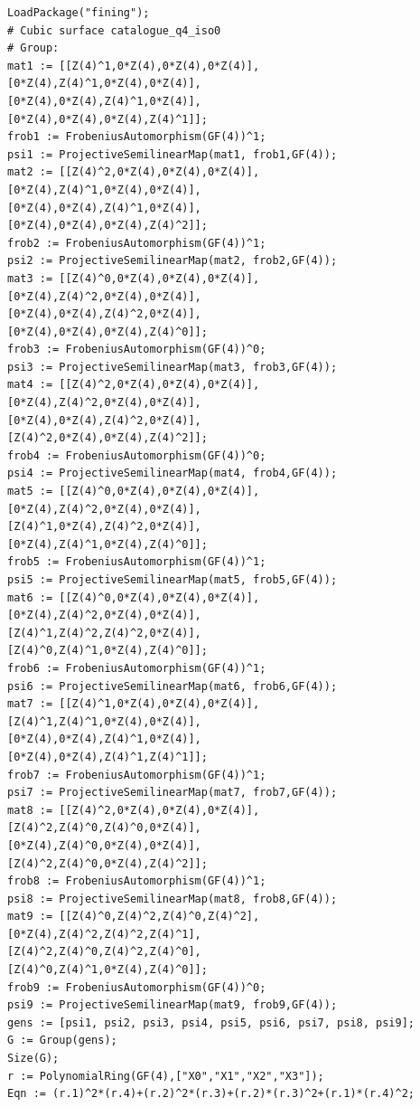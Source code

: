 \begin{verbatim}
LoadPackage("fining");
# Cubic surface catalogue_q4_iso0
# Group:
mat1 := [[Z(4)^1,0*Z(4),0*Z(4),0*Z(4)],
[0*Z(4),Z(4)^1,0*Z(4),0*Z(4)],
[0*Z(4),0*Z(4),Z(4)^1,0*Z(4)],
[0*Z(4),0*Z(4),0*Z(4),Z(4)^1]];
frob1 := FrobeniusAutomorphism(GF(4))^1;
psi1 := ProjectiveSemilinearMap(mat1, frob1,GF(4));
mat2 := [[Z(4)^2,0*Z(4),0*Z(4),0*Z(4)],
[0*Z(4),Z(4)^1,0*Z(4),0*Z(4)],
[0*Z(4),0*Z(4),Z(4)^1,0*Z(4)],
[0*Z(4),0*Z(4),0*Z(4),Z(4)^2]];
frob2 := FrobeniusAutomorphism(GF(4))^1;
psi2 := ProjectiveSemilinearMap(mat2, frob2,GF(4));
mat3 := [[Z(4)^0,0*Z(4),0*Z(4),0*Z(4)],
[0*Z(4),Z(4)^2,0*Z(4),0*Z(4)],
[0*Z(4),0*Z(4),Z(4)^2,0*Z(4)],
[0*Z(4),0*Z(4),0*Z(4),Z(4)^0]];
frob3 := FrobeniusAutomorphism(GF(4))^0;
psi3 := ProjectiveSemilinearMap(mat3, frob3,GF(4));
mat4 := [[Z(4)^2,0*Z(4),0*Z(4),0*Z(4)],
[0*Z(4),Z(4)^2,0*Z(4),0*Z(4)],
[0*Z(4),0*Z(4),Z(4)^2,0*Z(4)],
[Z(4)^2,0*Z(4),0*Z(4),Z(4)^2]];
frob4 := FrobeniusAutomorphism(GF(4))^0;
psi4 := ProjectiveSemilinearMap(mat4, frob4,GF(4));
mat5 := [[Z(4)^0,0*Z(4),0*Z(4),0*Z(4)],
[0*Z(4),Z(4)^2,0*Z(4),0*Z(4)],
[Z(4)^1,0*Z(4),Z(4)^2,0*Z(4)],
[0*Z(4),Z(4)^1,0*Z(4),Z(4)^0]];
frob5 := FrobeniusAutomorphism(GF(4))^1;
psi5 := ProjectiveSemilinearMap(mat5, frob5,GF(4));
mat6 := [[Z(4)^0,0*Z(4),0*Z(4),0*Z(4)],
[0*Z(4),Z(4)^2,0*Z(4),0*Z(4)],
[Z(4)^1,Z(4)^2,Z(4)^2,0*Z(4)],
[Z(4)^0,Z(4)^1,0*Z(4),Z(4)^0]];
frob6 := FrobeniusAutomorphism(GF(4))^1;
psi6 := ProjectiveSemilinearMap(mat6, frob6,GF(4));
mat7 := [[Z(4)^1,0*Z(4),0*Z(4),0*Z(4)],
[Z(4)^1,Z(4)^1,0*Z(4),0*Z(4)],
[0*Z(4),0*Z(4),Z(4)^1,0*Z(4)],
[0*Z(4),0*Z(4),Z(4)^1,Z(4)^1]];
frob7 := FrobeniusAutomorphism(GF(4))^1;
psi7 := ProjectiveSemilinearMap(mat7, frob7,GF(4));
mat8 := [[Z(4)^2,0*Z(4),0*Z(4),0*Z(4)],
[Z(4)^2,Z(4)^0,Z(4)^0,0*Z(4)],
[0*Z(4),Z(4)^0,0*Z(4),0*Z(4)],
[Z(4)^2,Z(4)^0,0*Z(4),Z(4)^2]];
frob8 := FrobeniusAutomorphism(GF(4))^1;
psi8 := ProjectiveSemilinearMap(mat8, frob8,GF(4));
mat9 := [[Z(4)^0,Z(4)^2,Z(4)^0,Z(4)^2],
[0*Z(4),Z(4)^2,Z(4)^2,Z(4)^1],
[Z(4)^2,Z(4)^0,Z(4)^2,Z(4)^0],
[Z(4)^0,Z(4)^1,0*Z(4),Z(4)^0]];
frob9 := FrobeniusAutomorphism(GF(4))^0;
psi9 := ProjectiveSemilinearMap(mat9, frob9,GF(4));
gens := [psi1, psi2, psi3, psi4, psi5, psi6, psi7, psi8, psi9];
G := Group(gens);
Size(G);
r := PolynomialRing(GF(4),["X0","X1","X2","X3"]);
Eqn := (r.1)^2*(r.4)+(r.2)^2*(r.3)+(r.2)*(r.3)^2+(r.1)*(r.4)^2;
\end{verbatim}
